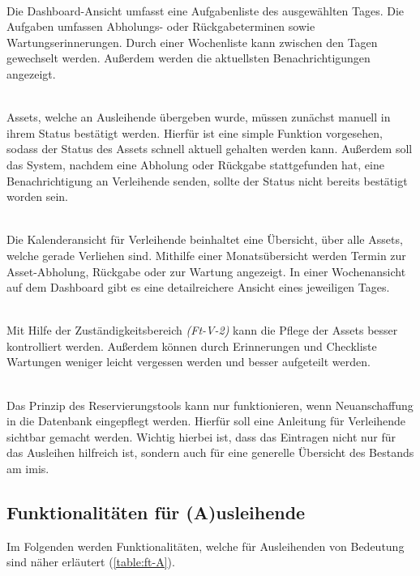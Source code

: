 {\sffamily\color{maincolor}{Ft-V-1 | Dashboard }}\\
Die Dashboard-Ansicht umfasst eine Aufgabenliste des ausgewählten Tages. Die Aufgaben umfassen
Abholungs- oder Rückgabeterminen sowie Wartungserinnerungen. Durch einer Wochenliste kann zwischen
den Tagen gewechselt werden. Außerdem werden die aktuellsten Benachrichtigungen angezeigt.



{\sffamily\color{maincolor}{Ft-V-2 | Bearbeiten des Assetstatus }}\\
Assets, welche an Ausleihende übergeben wurde, müssen zunächst manuell in ihrem Status bestätigt
werden. Hierfür ist eine simple Funktion vorgesehen, sodass der Status des Assets schnell aktuell
gehalten werden kann. Außerdem soll das System, nachdem eine Abholung oder Rückgabe stattgefunden
hat, eine Benachrichtigung an Verleihende senden, sollte der Status nicht bereits bestätigt worden
sein.

{\sffamily\color{maincolor}{Ft-B-4 | Kalenderansicht für Verleihende}}\\
Die Kalenderansicht für Verleihende beinhaltet eine Übersicht, über alle Assets, welche gerade
Verliehen sind. Mithilfe einer Monatsübersicht werden Termin zur Asset-Abholung, Rückgabe oder zur
Wartung angezeigt. In einer Wochenansicht auf dem Dashboard gibt es eine detailreichere Ansicht
eines jeweiligen Tages.


    {\sffamily\color{maincolor}{Ft-V-3 | Pflege von Assets   }}\\
Mit Hilfe der Zuständigkeitsbereich \textit{(Ft-V-2)} kann die Pflege der Assets besser kontrolliert
werden. Außerdem können durch Erinnerungen und Checkliste Wartungen weniger leicht vergessen werden
und besser aufgeteilt werden.


    {\sffamily\color{maincolor}{Ft-V-4 | Pflege der Datenbank }}\\
Das Prinzip des Reservierungstools kann nur funktionieren, wenn Neuanschaffung in die Datenbank
eingepflegt werden. Hierfür soll eine Anleitung für Verleihende sichtbar gemacht werden. Wichtig
hierbei ist, dass das Eintragen nicht nur für das Ausleihen hilfreich ist, sondern auch für eine
generelle Übersicht des Bestands am \ac{imis}.

\subsection{Funktionalitäten für (A)usleihende}
Im Folgenden werden Funktionalitäten, welche für Ausleihenden von Bedeutung sind näher erläutert
(\ref{table:ft-A}).


